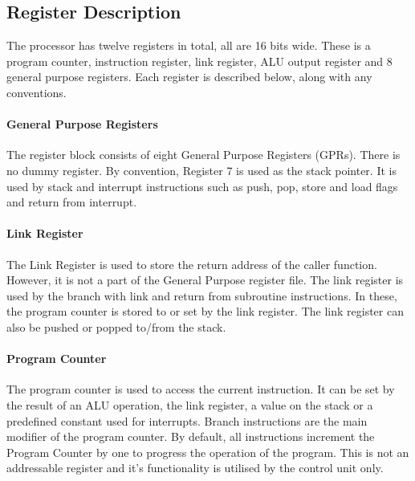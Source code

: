 
\subsection{Register Description}

The \samurai{} processor has twelve registers in total, all are 16 bits wide.
These is a program counter, instruction register, link register, ALU output register and 8 general purpose registers.
Each register is described below, along with any conventions.  

\paragraph{General Purpose Registers}
The register block consists of eight General Purpose Registers (GPRs). 
There is no dummy register. 
By convention, Register 7 is used as the stack pointer. 
It is used by stack and interrupt instructions such as push, pop, store and load flags and return from interrupt.  


\paragraph{Link Register} 
The Link Register is used to store the return address of the caller function. 
However, it is not a part of the General Purpose register file. 
The link register is used by the branch with link and return from subroutine instructions. 
In these, the program counter is stored to or set by the link register. 
The link register can also be pushed or popped to/from the stack.

\paragraph{Program Counter} 
The program counter is used to access the current instruction. 
It can be set by the result of an ALU operation, the link register, a value on the stack or a predefined constant used for interrupts.
Branch instructions are the main modifier of the program counter.
By default, all instructions increment the Program Counter by one to progress the operation of the program. 
This is not an addressable register and it's functionality is utilised by the control unit only. 

